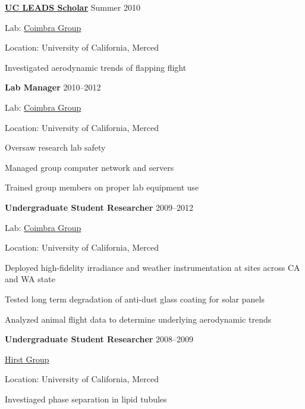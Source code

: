 \documentclass[10pt]{article}
\newcommand{\blankline}{\quad\pagebreak[3]}
\begin{document}
\blankline


\textbf{\href{http://graduatedivision.ucmerced.edu/grad-prep-programs/uc-leads}{UC LEADS Scholar}} \hfill Summer 2010
\begin{innerlist}
    \item Lab: \href{http://coimbra.ucsd.edu/}{Coimbra Group}
    \item Location: University of California, Merced
    \item Investigated aerodynamic trends of flapping flight
\end{innerlist}


\blankline


\textbf{Lab Manager} \hfill 2010--2012
\begin{innerlist}
    \item Lab: \href{http://coimbra.ucsd.edu/}{Coimbra Group}
    \item Location: University of California, Merced
    \item Oversaw research lab safety
    \item Managed group computer network and servers
    \item Trained group members on proper lab equipment use
\end{innerlist}


\blankline


\textbf{Undergraduate Student Researcher} \hfill 2009--2012
\begin{innerlist}
    \item Lab: \href{http://coimbra.ucsd.edu/}{Coimbra Group}
    \item Location: University of California, Merced
    \item Deployed high-fidelity irradiance and weather instrumentation at sites across CA and WA state
    \item Tested long term degradation of anti-dust glass coating for solar panels
    \item Analyzed animal flight data to determine underlying aerodynamic trends
\end{innerlist}


\blankline


\textbf{Undergraduate Student Researcher} \hfill 2008--2009 
\begin{innerlist}
    \item \href{http://faculty.ucmerced.edu/lhirst/}{Hirst Group}
    \item Location: University of California, Merced 
    \item Investiaged phase separation in lipid tubules
\end{innerlist}
\end{document}
